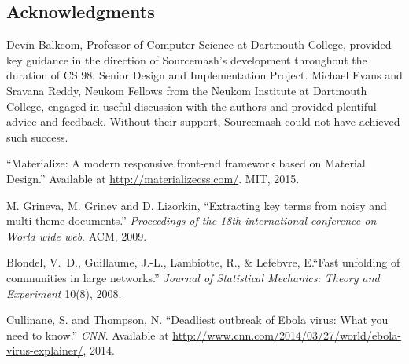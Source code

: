 \documentclass[11pt]{article}
\begin{document}

\subsection*{Acknowledgments}
Devin Balkcom, Professor of Computer Science at Dartmouth College, provided key guidance in the direction of Sourcemash's development throughout the duration of CS 98: Senior Design and Implementation Project. Michael Evans and Sravana Reddy, Neukom Fellows from the Neukom Institute at Dartmouth College, engaged in useful discussion with the authors and provided plentiful advice and feedback. Without their support, Sourcemash could not have achieved such success.


\begin{thebibliography}{99}

  ``Materialize: A modern responsive front-end framework based on Material Design.'' Available at \url{http://materializecss.com/}. MIT, 2015.

  M. Grineva, M. Grinev and D. Lizorkin, ``Extracting key terms from noisy and multi-theme documents.'' \emph{Proceedings of the 18th international conference on World wide web}. ACM, 2009.

 Blondel, V.~D., Guillaume, J.-L., Lambiotte, R., \& Lefebvre, E.``Fast unfolding of communities in large networks.'' \emph{Journal of Statistical Mechanics: Theory and Experiment} 10(8), 2008.

 Cullinane, S. and Thompson, N. ``Deadliest outbreak of Ebola virus: What you need to know.'' \emph{CNN}. Available at \url{http://www.cnn.com/2014/03/27/world/ebola-virus-explainer/}, 2014.

\end{thebibliography}
\end{document}
